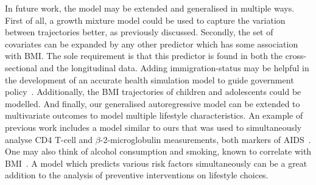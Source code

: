 \documentclass{imammb}
\numberwithin{equation}{section}
\begin{document}
In future work, the model may be extended and generalised in multiple ways. First of all, a growth mixture model could be used to capture the variation between trajectories better, as previously discussed. Secondly, the set of covariates can be expanded by any other predictor which has some association with BMI. The sole requirement is that this predictor is found in both the cross-sectional and the longitudinal data. Adding immigration-status may be helpful in the development of an accurate health simulation model to guide government policy~\citep{TenDam2023}. Additionally, the BMI trajectories of children and adolescents could be modelled. And finally, our generalised autoregressive model can be extended to multivariate outcomes to model multiple lifestyle characteristics. An example of previous work includes a model similar to ours that was used to simultaneously analyse CD4 T-cell and $\beta$-2-microglobulin measurements, both markers of AIDS~\citep{Sy1997}. One may also think of alcohol consumption and smoking, known to correlate with BMI~\citep{Chiolero2008, Traversy2015}. A model which predicts various risk factors simultaneously can be a great addition to the analysis of preventive interventions on lifestyle choices.

\vspace*{6pt}

\nocite{*}


\end{document}
